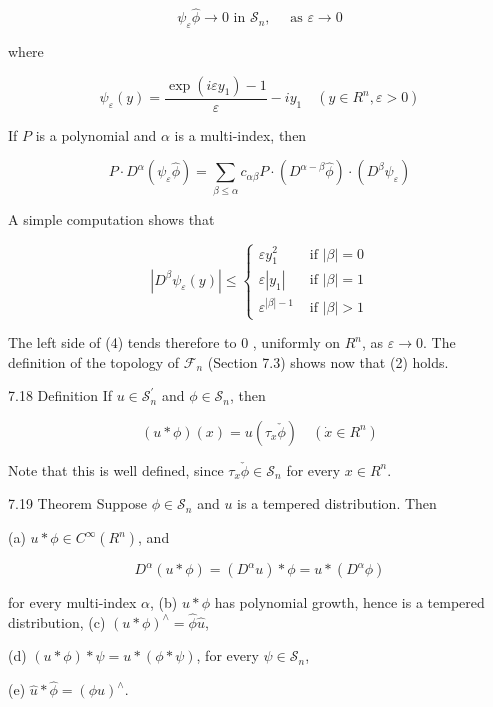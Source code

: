 \documentclass[10pt]{article}
\begin{document}
$$
\psi_{\varepsilon} \hat{\phi} \rightarrow 0 \text { in } \mathscr{S}_{n}, \quad \text { as } \varepsilon \rightarrow 0
$$

where

$$
\psi_{\varepsilon}(y)=\frac{\exp \left(i \varepsilon y_{1}\right)-1}{\varepsilon}-i y_{1} \quad\left(y \in R^{n}, \varepsilon>0\right)
$$

If $P$ is a polynomial and $\alpha$ is a multi-index, then

$$
P \cdot D^{\alpha}\left(\psi_{\varepsilon} \hat{\phi}\right)=\sum_{\beta \leq \alpha} c_{\alpha \beta} P \cdot\left(D^{\alpha-\beta} \hat{\phi}\right) \cdot\left(D^{\beta} \psi_{\varepsilon}\right)
$$

A simple computation shows that

$$
\left|D^{\beta} \psi_{\varepsilon}(y)\right| \leq \begin{cases}\varepsilon y_{1}^{2} & \text { if }|\beta|=0 \\ \varepsilon\left|y_{1}\right| & \text { if }|\beta|=1 \\ \varepsilon^{|\beta|-1} & \text { if }|\beta|>1\end{cases}
$$

The left side of (4) tends therefore to 0 , uniformly on $R^{n}$, as $\varepsilon \rightarrow 0$. The definition of the topology of $\mathscr{F}_{n}$ (Section 7.3) shows now that (2) holds.

7.18 Definition If $u \in \mathscr{S}_{n}^{\prime}$ and $\phi \in \mathscr{S}_{n}$, then

$$
(u * \phi)(x)=u\left(\tau_{x} \check{\phi}\right) \quad\left(\dot{x} \in R^{n}\right)
$$

Note that this is well defined, since $\tau_{x} \check{\phi} \in \mathscr{S}_{n}$ for every $x \in R^{n}$.

7.19 Theorem Suppose $\phi \in \mathscr{S}_{n}$ and $u$ is a tempered distribution. Then

(a) $u * \phi \in C^{\infty}\left(R^{n}\right)$, and

$$
D^{\alpha}(u * \phi)=\left(D^{\alpha} u\right) * \phi=u *\left(D^{\alpha} \phi\right)
$$

for every multi-index $\alpha$,
(b) $u * \phi$ has polynomial growth, hence is a tempered distribution,
(c) $(u * \phi)^{\wedge}=\hat{\phi} \hat{u}$,

(d) $(u * \phi) * \psi=u *(\phi * \psi)$, for every $\psi \in \mathscr{S}_{n}$,

(e) $\hat{u} * \hat{\phi}=(\phi u)^{\wedge}$.
\end{document}
